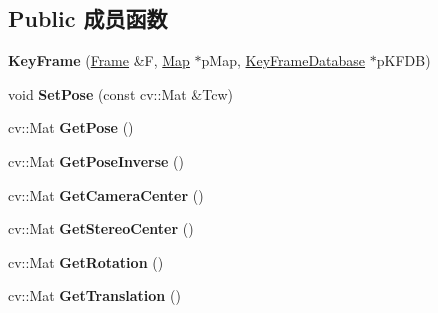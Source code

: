 \subsection*{Public 成员函数}
\begin{DoxyCompactItemize}
\item 
\hypertarget{classORB__SLAM2_1_1KeyFrame_a6b2fd06ed5e4a8f9546c515db554bcb6}{{\bfseries Key\-Frame} (\hyperlink{classORB__SLAM2_1_1Frame}{Frame} \&F, \hyperlink{classORB__SLAM2_1_1Map}{Map} $\ast$p\-Map, \hyperlink{classORB__SLAM2_1_1KeyFrameDatabase}{Key\-Frame\-Database} $\ast$p\-K\-F\-D\-B)}\label{classORB__SLAM2_1_1KeyFrame_a6b2fd06ed5e4a8f9546c515db554bcb6}

\item 
\hypertarget{classORB__SLAM2_1_1KeyFrame_aa799150fa33f3b9a404226454b96c95a}{void {\bfseries Set\-Pose} (const cv\-::\-Mat \&Tcw)}\label{classORB__SLAM2_1_1KeyFrame_aa799150fa33f3b9a404226454b96c95a}

\item 
\hypertarget{classORB__SLAM2_1_1KeyFrame_a49b5e212c1335cf585eaf6bbc4fed85c}{cv\-::\-Mat {\bfseries Get\-Pose} ()}\label{classORB__SLAM2_1_1KeyFrame_a49b5e212c1335cf585eaf6bbc4fed85c}

\item 
\hypertarget{classORB__SLAM2_1_1KeyFrame_a03be061f5dac65d360d65c6e8a63532f}{cv\-::\-Mat {\bfseries Get\-Pose\-Inverse} ()}\label{classORB__SLAM2_1_1KeyFrame_a03be061f5dac65d360d65c6e8a63532f}

\item 
\hypertarget{classORB__SLAM2_1_1KeyFrame_a535f0f7db34aca7c55ddadc2ad9f4a5f}{cv\-::\-Mat {\bfseries Get\-Camera\-Center} ()}\label{classORB__SLAM2_1_1KeyFrame_a535f0f7db34aca7c55ddadc2ad9f4a5f}

\item 
\hypertarget{classORB__SLAM2_1_1KeyFrame_aac7e26797d9b3e7ef4acd656056ff4ce}{cv\-::\-Mat {\bfseries Get\-Stereo\-Center} ()}\label{classORB__SLAM2_1_1KeyFrame_aac7e26797d9b3e7ef4acd656056ff4ce}

\item 
\hypertarget{classORB__SLAM2_1_1KeyFrame_a43cdfc1cebc87d949ae6e9a0202b0f1b}{cv\-::\-Mat {\bfseries Get\-Rotation} ()}\label{classORB__SLAM2_1_1KeyFrame_a43cdfc1cebc87d949ae6e9a0202b0f1b}

\item 
\hypertarget{classORB__SLAM2_1_1KeyFrame_a6f1426dc5447170df37c31db40edef14}{cv\-::\-Mat {\bfseries Get\-Translation} ()}\label{classORB__SLAM2_1_1KeyFrame_a6f1426dc5447170df37c31db40edef14}


\end{DoxyCompactItemize}
